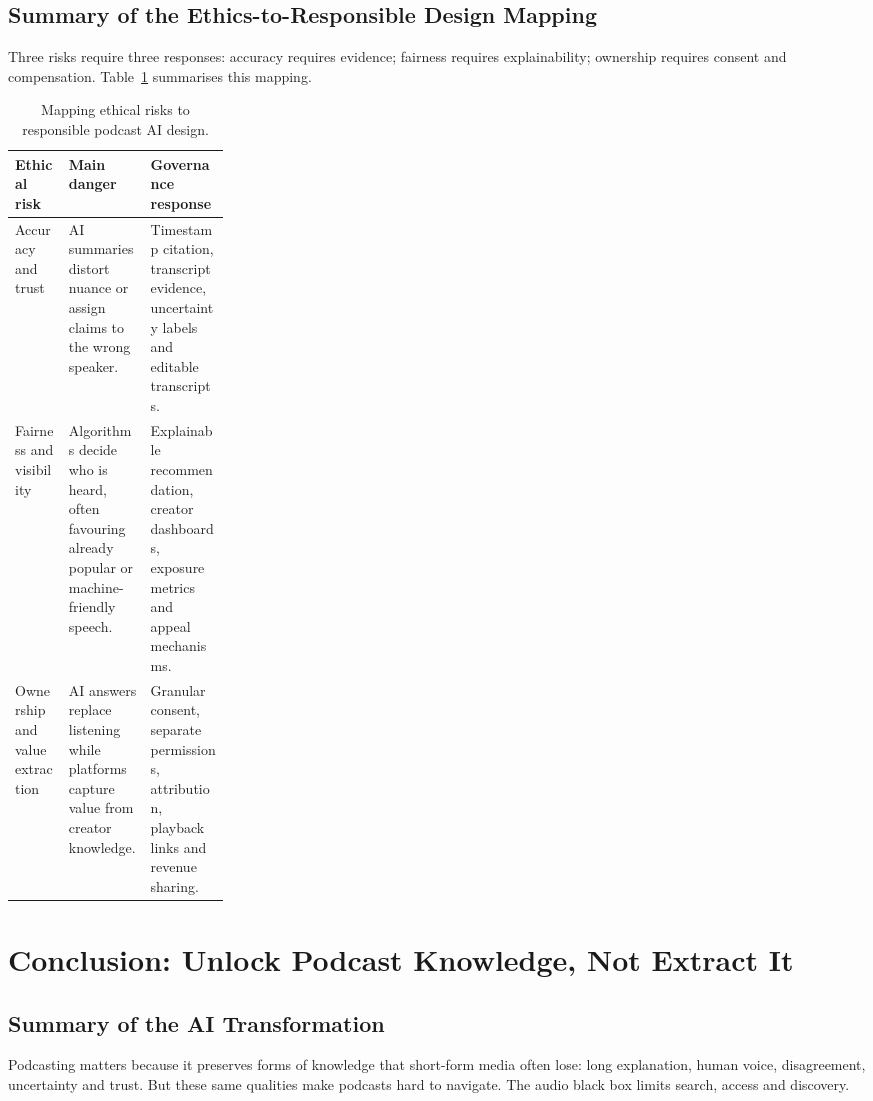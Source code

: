 \documentclass[11pt,a4paper]{article}
\begin{document}
\subsection{Summary of the Ethics-to-Responsible Design Mapping}

Three risks require three responses: accuracy requires evidence; fairness requires explainability; ownership requires consent and compensation. Table~\ref{tab:ethics-design} summarises this mapping.

\begin{table}[htbp]
\centering
\renewcommand{\arraystretch}{1.22}
\begin{tabularx}{0.96\linewidth}{>{\raggedright\arraybackslash}p{0.25\linewidth}
                                >{\raggedright\arraybackslash}X
                                >{\raggedright\arraybackslash}X}
\toprule
\textbf{Ethical risk} & \textbf{Main danger} & \textbf{Governance response} \\
\midrule
Accuracy and trust & AI summaries distort nuance or assign claims to the wrong speaker. & Timestamp citation, transcript evidence, uncertainty labels and editable transcripts. \\
Fairness and visibility & Algorithms decide who is heard, often favouring already popular or machine-friendly speech. & Explainable recommendation, creator dashboards, exposure metrics and appeal mechanisms. \\
Ownership and value extraction & AI answers replace listening while platforms capture value from creator knowledge. & Granular consent, separate permissions, attribution, playback links and revenue sharing. \\
\bottomrule
\end{tabularx}
\caption{Mapping ethical risks to responsible podcast AI design.}
\label{tab:ethics-design}
\end{table}



\section{Conclusion: Unlock Podcast Knowledge, Not Extract It}



\subsection{Summary of the AI Transformation}

Podcasting matters because it preserves forms of knowledge that short-form media often lose: long explanation, human voice, disagreement, uncertainty and trust. But these same qualities make podcasts hard to navigate. The audio black box limits search, access and discovery.
\end{document}
